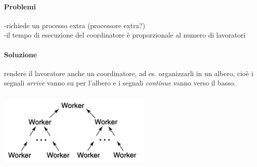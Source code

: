\documentclass[10pt,a4paper]{book}
\begin{document}
\paragraph{Problemi}
-richiede un processo extra (processore extra?)\\
-il tempo di esecuzione del coordinatore è proporzionale al numero di lavoratori
\paragraph{Soluzione}
rendere il lavoratore anche un coordinatore, ad es. organizzarli in un albero, cioè i segnali \textit{arrive} vanno su per l'albero e i segnali \textit{continue} vanno verso il basso.\\ \\
\includegraphics[scale=0.6]{img/tree.png} \\ \\
\end{document}

